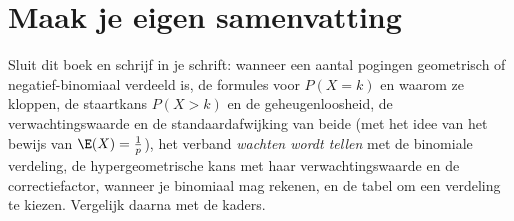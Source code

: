 
\begin{oefeningen}






\end{oefeningen}


\ifzelfstudie
\section*{Maak je eigen samenvatting}
Sluit dit boek en schrijf in je schrift: wanneer een aantal pogingen geometrisch of negatief-binomiaal verdeeld is, de formules voor $P(X = k)$ en waarom ze kloppen, de staartkans $P(X > k)$ en de geheugenloosheid, de verwachtingswaarde en de standaardafwijking van beide (met het idee van het bewijs van $\E(X) = \frac1p$), het verband \textit{wachten wordt tellen} met de binomiale verdeling, de hypergeometrische kans met haar verwachtingswaarde en de correctiefactor, wanneer je binomiaal mag rekenen, en de tabel om een verdeling te kiezen. Vergelijk daarna met de kaders.
\fi
